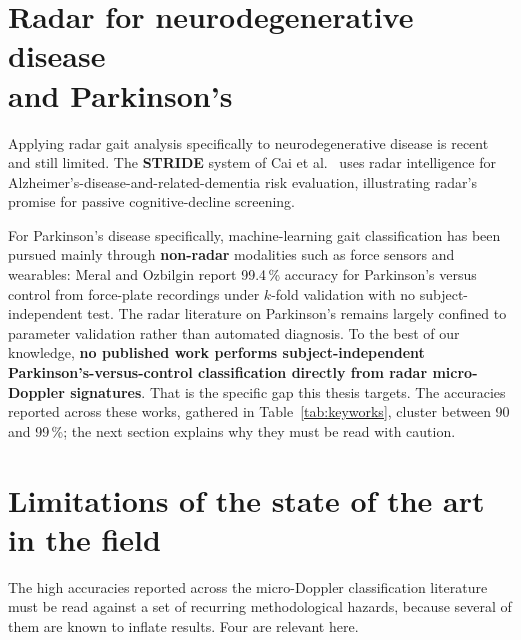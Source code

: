 \section[Radar for neurodegenerative disease and Parkinson's]{Radar for neurodegenerative disease\\ and Parkinson's}
\label{sec:neuro}

Applying radar gait analysis specifically to neurodegenerative disease is recent
and still limited. The \textbf{STRIDE} system of Cai et al.\ \cite{cai2023} uses radar
intelligence for Alzheimer's-disease-and-related-dementia risk evaluation,
illustrating radar's promise for passive cognitive-decline screening.

For Parkinson's disease specifically, machine-learning gait classification has
been pursued mainly through \textbf{non-radar} modalities such as force sensors
and wearables: Meral and Ozbilgin \cite{neurosurgery2025} report 99.4\,\%
accuracy for Parkinson's versus control from force-plate recordings under
$k$-fold validation with no subject-independent test. The radar literature on Parkinson's
remains largely confined to parameter validation \cite{lopezdelgado2026} rather
than automated diagnosis. To the best of our knowledge, \textbf{no published work
performs subject-independent Parkinson's-versus-control classification directly
from radar micro-Doppler signatures}. That is the specific gap this thesis
targets. The accuracies reported across these works, gathered in
Table~\ref{tab:keyworks}, cluster between 90 and 99\,\%; the next section
explains why they must be read with caution.

\section{Limitations of the state of the art in the field}
\label{sec:pitfalls}

The high accuracies reported across the micro-Doppler classification literature
must be read against a set of recurring methodological hazards, because several
of them are known to inflate results. Four are relevant here.

